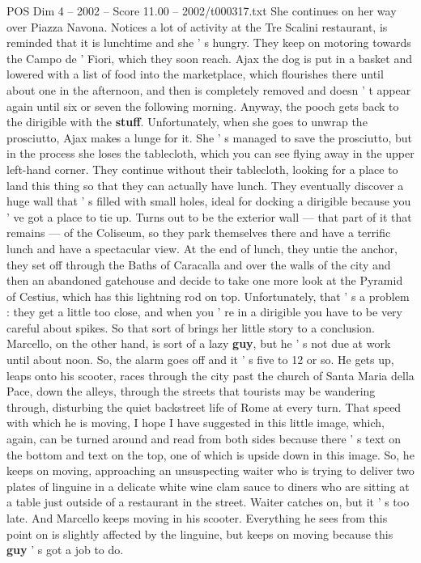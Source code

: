 \begin{textsample}{POS Dim 4 – 2002 – Score 11.00 – 2002/t000317.txt}
She continues on her way over Piazza Navona.
Notices a lot of activity at the Tre Scalini restaurant, is reminded that it is lunchtime and she ' s hungry.
They keep on motoring towards the Campo de ' Fiori, which they soon reach.
Ajax the dog is put in a basket and lowered with a list of food into the marketplace, which flourishes there until about one in the afternoon, and then is completely removed and doesn ' t appear again until six or seven the following morning.
Anyway, the pooch gets back to the dirigible with the \textbf{stuff}.
Unfortunately, when she goes to unwrap the prosciutto, Ajax makes a lunge for it.
She ' s managed to save the prosciutto, but in the process she loses the tablecloth, which you can see flying away in the upper left-hand corner.
They continue without their tablecloth, looking for a place to land this thing so that they can actually have lunch.
They eventually discover a huge wall that ' s filled with small holes, ideal for docking a dirigible because you ' ve got a place to tie up.
Turns out to be the exterior wall — that part of it that remains — of the Coliseum, so they park themselves there and have a terrific lunch and have a spectacular view.
At the end of lunch, they untie the anchor, they set off through the Baths of Caracalla and over the walls of the city and then an abandoned gatehouse and decide to take one more look at the Pyramid of Cestius, which has this lightning rod on top.
Unfortunately, that ' s a problem : they get a little too close, and when you ' re in a dirigible you have to be very careful about spikes.
So that sort of brings her little story to a conclusion.
Marcello, on the other hand, is sort of a lazy \textbf{guy}, but he ' s not due at work until about noon.
So, the alarm goes off and it ' s five to 12 or so.
He gets up, leaps onto his scooter, races through the city past the church of Santa Maria della Pace, down the alleys, through the streets that tourists may be wandering through, disturbing the quiet backstreet life of Rome at every turn.
That speed with which he is moving, I hope I have suggested in this little image, which, again, can be turned around and read from both sides because there ' s text on the bottom and text on the top, one of which is upside down in this image.
So, he keeps on moving, approaching an unsuspecting waiter who is trying to deliver two plates of linguine in a delicate white wine clam sauce to diners who are sitting at a table just outside of a restaurant in the street.
Waiter catches on, but it ' s too late.
And Marcello keeps moving in his scooter.
Everything he sees from this point on is slightly affected by the linguine, but keeps on moving because this \textbf{guy} ' s got a job to do.

\end{textsample}
